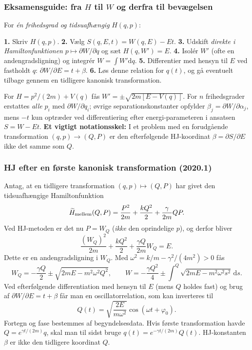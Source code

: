 \subsubsection*{Eksamensguide: fra $H$ til $W$ og derfra til bevægelsen}
For \emph{én frihedsgrad og tidsuafhængig} $H(q,p)$:
\begin{method}\textbf{1.} Skriv $H(q,p)$. \textbf{2.} Vælg $S(q,E,t)=W(q,E)-Et$. \textbf{3.} Udskift \emph{direkte i Hamiltonfunktionen} $p\mapsto\partial W/\partial q$ og sæt $H(q,W')=E$. \textbf{4.} Isolér $W'$ (ofte en andengradsligning) og integrér $W=\int W'\mathrm dq$. \textbf{5.} Differentier med hensyn til $E$ ved fastholdt $q$: $\boxed{\partial W/\partial E=t+\beta}$. \textbf{6.} Løs denne relation for $q(t)$, og gå eventuelt tilbage gennem en tidligere kanonisk transformation.\end{method}
For $H=p^2/(2m)+V(q)$ fås $W'=\pm\sqrt{2m[E-V(q)]}$. For $n$ frihedsgrader erstattes \emph{alle} $p_i$ med $\partial W/\partial q_i$; øvrige separationskonstanter opfylder $\beta_j=\partial W/\partial\alpha_j$, mens $-t$ kun optræder ved differentiering efter energi-parameteren i ansatsen $S=W-Et$.
\textbf{Et vigtigt notationsskel:} I et problem med en forudgående transformation $(q,p)\to(Q,P)$ er den efterfølgende HJ-koordinat $\beta=\partial S/\partial E$ ikke det samme som $Q$.

\subsubsection*{HJ efter en første kanonisk transformation (2020.1)}
Antag, at en tidligere transformation $(q,p)\mapsto(Q,P)$ har givet den tidsuafhængige Hamiltonfunktion
\[\widetilde H_{\rm mellem}(Q,P)=\frac{P^2}{2m}+\frac{kQ^2}{2}+\frac{\gamma}{2m}QP.\]
Ved HJ-metoden er det nu $P=W_Q$ (\emph{ikke} den oprindelige $p$), og derfor bliver
\[\frac{(W_Q)^2}{2m}+\frac{kQ^2}{2}+\frac{\gamma Q}{2m}W_Q=E.\]
Dette er en andengradsligning i $W_Q$. Med $\omega^2=k/m-\gamma^2/(4m^2)>0$ fås
\[W_Q=-\frac{\gamma Q}{2}\pm\sqrt{2mE-m^2\omega^2Q^2},\qquad
\boxed{W=-\frac{\gamma Q^2}{4}\pm\int^Q\sqrt{2mE-m^2\omega^2s^2}\,\mathrm ds}.\]
Ved efterfølgende differentiation med hensyn til $E$ (mens $Q$ holdes fast) og brug af $\partial W/\partial E=t+\beta$ får man en oscillatorrelation, som kan inverteres til
\[Q(t)=\sqrt{\frac{2E}{m\omega^2}}\cos(\omega t+\varphi_0).\]
Fortegn og fase bestemmes af begyndelsesdata. Hvis første transformation havde $Q=e^{\gamma t/(2m)}q$, skal man til sidst bruge $q(t)=e^{-\gamma t/(2m)}Q(t)$. HJ-konstanten $\beta$ er ikke den tidligere koordinat $Q$.

